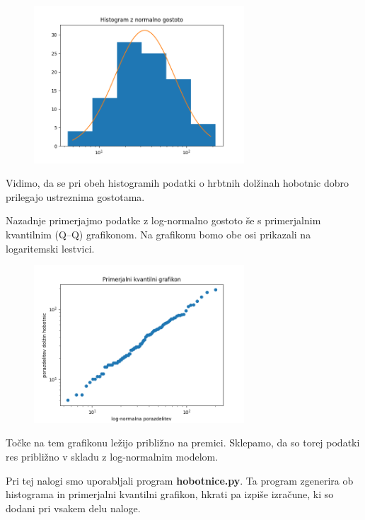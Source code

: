 \documentclass[a4paper,12pt]{article}
\theoremstyle{definition}
\theoremstyle{plain}
\begin{document}
\begin{figure}[H]
    \centering
    \label{fig:hist2}
    \includegraphics[width=0.7\textwidth]{Histogram2.png}
\end{figure}

Vidimo, da se pri obeh histogramih podatki o hrbtnih dolžinah hobotnic dobro prilegajo ustreznima gostotama.

Nazadnje primerjajmo podatke z log-normalno gostoto še s primerjalnim kvantilnim (Q–Q) grafikonom. Na grafikonu bomo obe osi prikazali na logaritemski lestvici.

\begin{figure}[H]
    \centering
    \label{fig:qqgraph}
    \includegraphics[width=0.7\textwidth]{PrimerjalniGrafikon.png}
\end{figure}

Točke na tem grafikonu ležijo približno na premici. Sklepamo, da so torej podatki res približno v skladu z log-normalnim modelom.

Pri tej nalogi smo uporabljali program \textbf{hobotnice.py}. Ta program zgenerira ob histograma in primerjalni kvantilni grafikon, hkrati pa izpiše izračune, ki so dodani pri vsakem delu naloge.
\end{document}
